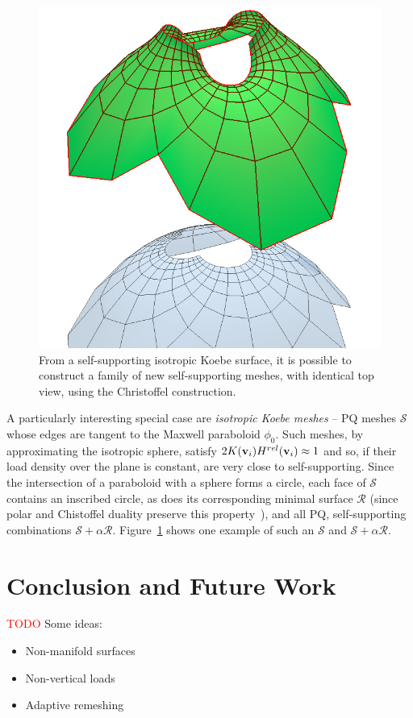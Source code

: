 \documentclass[annual]{acmsiggraph}
\def\SS{{\mathcal S}}
\def\RR{{\mathcal R}}
\newcommand{\todo}[1]{\textcolor{red}{#1}}
\begin{document}
 \begin{figure}[ht]
  \includegraphics[width=.45\columnwidth]{fig/enneper}
\begin{minipage}[b]{.48\columnwidth}	
 \caption{From a self-supporting isotropic Koebe surface, it is possible to construct a family of new
self-supporting meshes, with identical top view, using the Christoffel construction. \label{fig:enneper}}
\end{minipage}
 \end{figure}

A particularly interesting special case are \emph{isotropic Koebe meshes} -- PQ meshes $\SS$ whose edges
are tangent to the Maxwell paraboloid $\phi_0$. Such meshes, by approximating the isotropic sphere,
satisfy $2K({\mathbf v}_i) H^{rel}({\mathbf v}_i) \approx 1$ and so, if their load density over the plane is constant,
are very close to self-supporting. Since the intersection of a paraboloid with a sphere forms a circle,
each face of $\SS$ contains an inscribed circle, as does its corresponding minimal surface $\RR$ (since polar and Chistoffel duality
preserve this property~\cite{Pottmann2007}), and all PQ, self-supporting combinations $\SS + \alpha \RR$.
Figure~\ref{fig:enneper} shows one example of such an $\SS$ and $\SS+\alpha \RR$.

\section{Conclusion and Future Work}

\todo{TODO}
Some ideas:
\begin{itemize}
\item{Non-manifold surfaces}
\item{Non-vertical loads}
\item{Adaptive remeshing}
\end{itemize}





\let\otb=\thebibliography
\def\thebibliography#1{\otb{#1}\itemsep-1pt}

\end{document}
